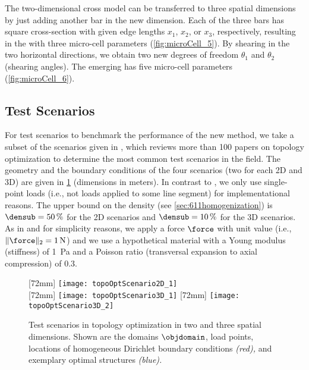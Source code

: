 The two-dimensional cross model can be transferred to three
spatial dimensions by just adding another bar in the new dimension.
Each of the three bars has square cross-section with given edge lengths
$x_1$, $x_2$, or $x_3$, respectively,
resulting in the  with three micro-cell parameters
(\cref{fig:microCell_5}).
By shearing in the two horizontal directions,
we obtain two new degrees of freedom $\theta_1$ and $\theta_2$
(shearing angles).
The emerging  has five micro-cell parameters
(\cref{fig:microCell_6}).



\subsection{Test Scenarios}
\label{sec:632scenarios}


For test scenarios to benchmark the performance of the new method,
we take a subset of the scenarios given in \cite{Valdez17Topology},
which reviews more than 100 papers on topology optimization
to determine the most common test scenarios in the field.
The geometry and the boundary conditions of the
four scenarios (two for each 2D and 3D)
are given in \cref{fig:topoOptScenario} (dimensions in meters).
In contrast to \cite{Valdez17Topology},
we only use single-point loads
(i.e., not loads applied to some line segment)
for implementational reasons.
The upper bound on the density (see \cref{sec:611homogenization})
is $\densub = \SI{50}{\percent}$ for the 2D scenarios and
$\densub = \SI{10}{\percent}$ for the 3D scenarios.
As in \cite{Sigmund01Line} and for simplicity reasons,
we apply a force $\force$ with unit value
(i.e., $\norm[2]{\force} = \SI{1}{\newton}$)
and we use a hypothetical material with
a Young modulus (stiffness) of \SI{1}{\pascal} and
a Poisson ratio (transversal expansion to axial compression) of $0.3$.

\begin{figure}
  [72mm]{%
    \texttt{[image: topoOptScenario2D\_1]}%
  }%
  \hfill%
  \\[7mm]%
  [72mm]{%
    \texttt{[image: topoOptScenario3D\_1]}%
  }%
  \hfill%
  [72mm]{%
    \texttt{[image: topoOptScenario3D\_2]}%
  }%
  \caption[Test scenarios in topology optimization]{%
    Test scenarios in topology optimization in
    two and three spatial dimensions.
    Shown are
    the domains $\objdomain$,
    load points,
    locations of homogeneous Dirichlet boundary conditions
    \emph{\textcolor{C1}{(red)},} and
    exemplary optimal structures \emph{\textcolor{C0}{(blue)}.}%
  }%
  \label{fig:topoOptScenario}%
\end{figure}

